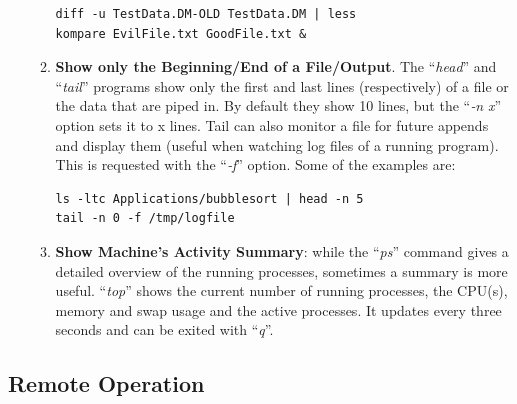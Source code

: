 \begin{itemize}
\begin{enumerate}
\begin{lstlisting}
diff -u TestData.DM-OLD TestData.DM | less
kompare EvilFile.txt GoodFile.txt &
\end{lstlisting}
\item
  \textbf{Show only the Beginning/End of a File/Output}. The
  ``\emph{head}'' and ``\emph{tail}'' programs show only the first and
  last lines (respectively) of a file or the data that are piped in. By
  default they show 10 lines, but the ``\emph{‑n x}'' option sets it to
  x lines. Tail can also monitor a file for future appends and display
  them (useful when watching log files of a running program). This is
  requested with the ``\emph{‑f}'' option. Some of the examples are:
\begin{lstlisting}
ls -ltc Applications/bubblesort | head -n 5
tail -n 0 -f /tmp/logfile
\end{lstlisting}
\item
  \textbf{Show Machine's Activity Summary}: while the ``\emph{ps}''
  command gives a detailed overview of the running processes, sometimes
  a summary is more useful. ``\emph{top}'' shows the current number of
  running processes, the CPU(s), memory and swap usage and the active
  processes. It updates every three seconds and can be exited with
  ``\emph{q}''.
\end{enumerate}
\end{itemize}
\hypertarget{remote-operation}{%
\subsection{Remote Operation}\label{remote-operation}}
